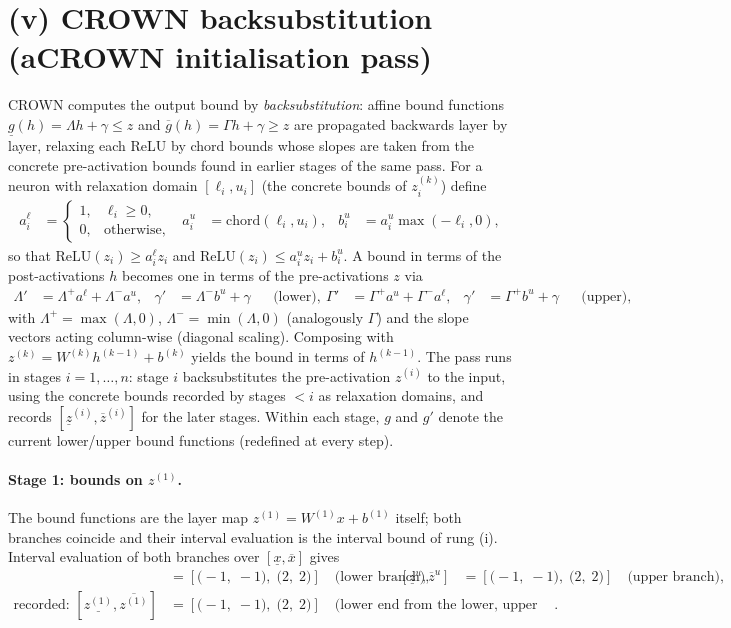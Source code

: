 \documentclass[11pt]{article}
\begin{document}
\section{(v) CROWN backsubstitution (aCROWN initialisation pass)}
CROWN computes the output bound by \emph{backsubstitution}: affine bound functions
$\underline{g}(h) = \Lambda h + \gamma \le z$ and $\overline{g}(h) = \Gamma h + \gamma \ge z$
are propagated backwards layer by layer, relaxing each ReLU by chord bounds whose slopes are taken
from the concrete pre-activation bounds found in earlier stages of the same pass. For a neuron with
relaxation domain $[\ell_i, u_i]$ (the concrete bounds of $z^{(k)}_i$) define
\begin{align*}
a^{\ell}_i &= \begin{cases} 1, & \ell_i \ge 0,\\ 0, & \text{otherwise}, \end{cases} & a^{u}_i &= \mathrm{chord}(\ell_i, u_i), & b^{u}_i &= a^{u}_i \max(-\ell_i, 0),
\end{align*}
so that $\mathrm{ReLU}(z_i) \ge a^{\ell}_i z_i$ and
$\mathrm{ReLU}(z_i) \le a^{u}_i z_i + b^{u}_i$. A bound in terms of the post-activations $h$ becomes
one in terms of the pre-activations $z$ via
\begin{align*}
\Lambda' &= \Lambda^{+} a^{\ell} + \Lambda^{-} a^{u}, & \gamma' &= \Lambda^{-} b^{u} + \gamma && \text{(lower)}, \
\Gamma' &= \Gamma^{+} a^{u} + \Gamma^{-} a^{\ell}, & \gamma' &= \Gamma^{+} b^{u} + \gamma && \text{(upper)},
\end{align*}
with $\Lambda^{+} = \max(\Lambda, 0)$, $\Lambda^{-} = \min(\Lambda, 0)$ (analogously $\Gamma$) and the
slope vectors acting column-wise (diagonal scaling). Composing with
$z^{(k)} = W^{(k)} h^{(k-1)} + b^{(k)}$ yields the bound in terms of $h^{(k-1)}$. The pass runs in
stages $i = 1, \dots, n$: stage $i$ backsubstitutes the pre-activation $z^{(i)}$ to the input, using
the concrete bounds recorded by stages $< i$ as relaxation domains, and records
$[\underline{z}^{(i)}, \overline{z}^{(i)}]$ for the later stages. Within each stage, $g$ and $g'$
denote the current lower/upper bound functions (redefined at every step).
\paragraph{Stage 1: bounds on $z^{(1)}$.}
The bound functions are the layer map $z^{(1)} = W^{(1)} x + b^{(1)}$ itself; both branches coincide and their interval evaluation is the interval bound of rung (i).
Interval evaluation of both branches over $[\underline{x}, \overline{x}]$ gives
\begin{align*}
[\underline{z}^{\ell}, \overline{z}^{\ell}] &= [\bigl(-1,\; -1\bigr),\; \bigl(2,\; 2\bigr)] \quad\text{(lower branch)}, & [\underline{z}^{u}, \overline{z}^{u}] &= [\bigl(-1,\; -1\bigr),\; \bigl(2,\; 2\bigr)] \quad\text{(upper branch)}, \\
\text{recorded: } [\underline{z^{(1)}}, \overline{z^{(1)}}] &= [\bigl(-1,\; -1\bigr),\; \bigl(2,\; 2\bigr)] \quad\text{(lower end from the lower, upper end from the upper branch)}.
\end{align*}
\end{document}
